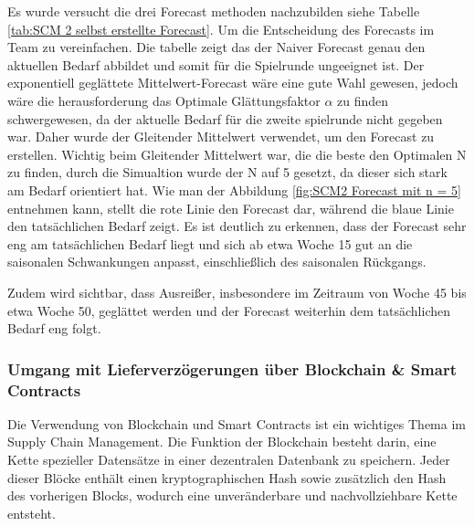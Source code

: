 \documentclass[a4paper,12pt]{article}
\begin{document}
Es wurde versucht die drei Forecast methoden nachzubilden siehe Tabelle \ref{tab:SCM 2 selbst erstellte Forecast}. 
Um die Entscheidung des Forecasts im Team zu vereinfachen.
Die tabelle zeigt das der Naiver Forecast genau den aktuellen Bedarf abbildet und somit für die Spielrunde ungeeignet ist.
Der exponentiell geglättete Mittelwert-Forecast wäre eine gute Wahl gewesen,
jedoch wäre die herausforderung das Optimale Glättungsfaktor $\alpha$ zu finden schwergewesen, da der aktuelle Bedarf für die zweite spielrunde nicht gegeben war.
Daher wurde der Gleitender Mittelwert verwendet, um den Forecast zu erstellen.
Wichtig beim Gleitender Mittelwert war, die die beste den Optimalen N zu finden,
durch die Simualtion wurde der N auf 5 gesetzt, da dieser sich stark am Bedarf orientiert hat.
Wie man der Abbildung \ref{fig:SCM2 Forecast mit n = 5} entnehmen kann,
stellt die rote Linie den Forecast dar, während die blaue Linie den tatsächlichen Bedarf zeigt.
Es ist deutlich zu erkennen, dass der Forecast sehr eng am tatsächlichen Bedarf liegt und sich ab etwa Woche 15 gut an die saisonalen Schwankungen anpasst, einschließlich des saisonalen Rückgangs.

Zudem wird sichtbar, dass Ausreißer, insbesondere im Zeitraum von Woche 45 bis etwa Woche 50, geglättet werden und der Forecast weiterhin dem tatsächlichen Bedarf eng folgt.


\subsubsection{Umgang mit Lieferverzögerungen über Blockchain \& Smart Contracts}
Die Verwendung von Blockchain und Smart Contracts ist ein wichtiges Thema im Supply Chain Management.
Die Funktion der Blockchain besteht darin, eine Kette spezieller Datensätze in einer dezentralen Datenbank zu speichern.
Jeder dieser Blöcke enthält einen kryptographischen Hash sowie zusätzlich den Hash des vorherigen Blocks, wodurch eine unveränderbare und nachvollziehbare Kette entsteht.
\end{document}
